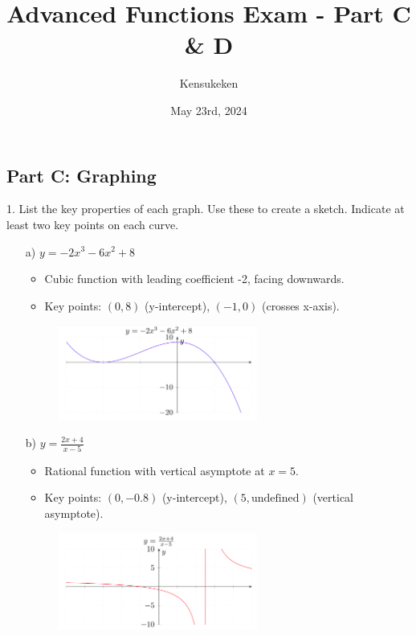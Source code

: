 \documentclass{article}
\title{Advanced Functions Exam - Part C \& D}
\author{Kensukeken}
\date{May 23rd, 2024}
\newenvironment{solution}{\color{solutioncolor}}{}
\begin{document}
\maketitle

\subsection*{Part C: Graphing}
1. List the key properties of each graph. Use these to create a sketch. Indicate at least two key points on each curve.
\begin{enumerate}
    \item[a)] \( y = -2x^3 - 6x^2 + 8 \)
    \begin{solution}
           \begin{itemize}
           \item Cubic function with leading coefficient -2, facing downwards.
           \item Key points: \((0, 8)\) (y-intercept), \((-1, 0)\) (crosses x-axis).
       \end{itemize}
     \begin{figure}[h]
    \centering
    \includegraphics[width=0.62\textwidth]{imgs/imgs FSE/y=-2x^3-6x^2+8.png}
    \label{fig:image}
\end{figure}  
    \end{solution}
    \item[b)] \( y = \frac{2x + 4}{x - 5} \)
     \begin{solution}  
       \begin{itemize}
           \item Rational function with vertical asymptote at \( x = 5 \).
           \item Key points: \((0, -0.8)\) (y-intercept), \((5, \text{undefined})\) (vertical asymptote).
       \end{itemize}
    \begin{figure}[h]
    \centering
    \includegraphics[width=0.62\textwidth]{imgs/imgs FSE/y=2x+4_x-5.png}

\end{figure}
\end{solution}
\end{enumerate}
\end{document}
